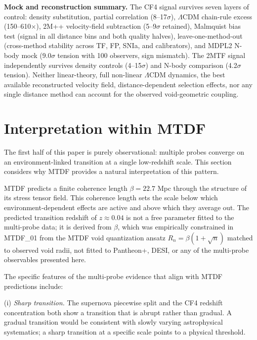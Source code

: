 \documentclass[11pt,a4paper]{article}
\begin{document}
\begin{mdframed}[linecolor=accent,linewidth=0.5pt,backgroundcolor=callout-bg,leftline=true,rightline=true,topline=true,bottomline=true,innerleftmargin=8pt,innerrightmargin=8pt,innertopmargin=6pt,innerbottommargin=6pt]
\textbf{Mock and reconstruction summary.} The CF4 signal survives seven layers of control: density substitution, partial correlation (8--17\(\sigma\)), \(\Lambda\)CDM chain-rule excess (150--610$\times$), 2M++ velocity-field subtraction (5--9\(\sigma\) retained), Malmquist bias test (signal in all distance bins and both quality halves), leave-one-method-out (cross-method stability across TF, FP, SNIa, and calibrators), and MDPL2 N-body mock (9.0\(\sigma\) tension with 100 observers, sign mismatch). The 2MTF signal independently survives density controls (4--15\(\sigma\)) and N-body comparison (4.2\(\sigma\) tension). Neither linear-theory, full non-linear \(\Lambda\)CDM dynamics, the best available reconstructed velocity field, distance-dependent selection effects, nor any single distance method can account for the observed void-geometric coupling.
\end{mdframed}

\section{Interpretation within MTDF}
\label{sec:sec8}
The first half of this paper is purely observational: multiple probes converge on an environment-linked transition at a single low-redshift scale. This section considers why MTDF provides a natural interpretation of this pattern.

MTDF predicts a finite coherence length \(\beta = 22.7\) Mpc through the structure of its stress tensor field. This coherence length sets the scale below which environment-dependent effects are active and above which they average out. The predicted transition redshift of \(z \approx 0.04\) is not a free parameter fitted to the multi-probe data; it is derived from \(\beta\), which was empirically constrained in MTDF\_\allowbreak{}01 from the MTDF void quantization ansatz \(R_n = \beta(1+\sqrt{n})\) matched to observed void radii, not fitted to Pantheon+, DESI, or any of the multi-probe observables presented here.

The specific features of the multi-probe evidence that align with MTDF predictions include:

(i) \emph{Sharp transition.} The supernova piecewise split and the CF4 redshift concentration both show a transition that is abrupt rather than gradual. A gradual transition would be consistent with slowly varying astrophysical systematics; a sharp transition at a specific scale points to a physical threshold.
\end{document}
